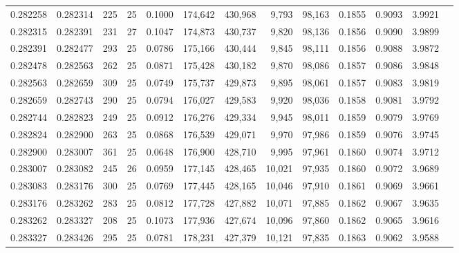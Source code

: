 \begin{tabular}{rrrrrrrrrrrrr}
0.282258 & 0.282314 &   225 &  25 &                                     0.1000 & 174,642 & 430,968 &   9,793 &  98,163 & 0.1855 & 0.9093 & 3.9921 \\
0.282315 & 0.282391 &   231 &  27 &                                     0.1047 & 174,873 & 430,737 &   9,820 &  98,136 & 0.1856 & 0.9090 & 3.9899 \\
0.282391 & 0.282477 &   293 &  25 &                                     0.0786 & 175,166 & 430,444 &   9,845 &  98,111 & 0.1856 & 0.9088 & 3.9872 \\
0.282478 & 0.282563 &   262 &  25 &                                     0.0871 & 175,428 & 430,182 &   9,870 &  98,086 & 0.1857 & 0.9086 & 3.9848 \\
0.282563 & 0.282659 &   309 &  25 &                                     0.0749 & 175,737 & 429,873 &   9,895 &  98,061 & 0.1857 & 0.9083 & 3.9819 \\
0.282659 & 0.282743 &   290 &  25 &                                     0.0794 & 176,027 & 429,583 &   9,920 &  98,036 & 0.1858 & 0.9081 & 3.9792 \\
0.282744 & 0.282823 &   249 &  25 &                                     0.0912 & 176,276 & 429,334 &   9,945 &  98,011 & 0.1859 & 0.9079 & 3.9769 \\
0.282824 & 0.282900 &   263 &  25 &                                     0.0868 & 176,539 & 429,071 &   9,970 &  97,986 & 0.1859 & 0.9076 & 3.9745 \\
0.282900 & 0.283007 &   361 &  25 &                                     0.0648 & 176,900 & 428,710 &   9,995 &  97,961 & 0.1860 & 0.9074 & 3.9712 \\
0.283007 & 0.283082 &   245 &  26 &                                     0.0959 & 177,145 & 428,465 &  10,021 &  97,935 & 0.1860 & 0.9072 & 3.9689 \\
0.283083 & 0.283176 &   300 &  25 &                                     0.0769 & 177,445 & 428,165 &  10,046 &  97,910 & 0.1861 & 0.9069 & 3.9661 \\
0.283176 & 0.283262 &   283 &  25 &                                     0.0812 & 177,728 & 427,882 &  10,071 &  97,885 & 0.1862 & 0.9067 & 3.9635 \\
0.283262 & 0.283327 &   208 &  25 &                                     0.1073 & 177,936 & 427,674 &  10,096 &  97,860 & 0.1862 & 0.9065 & 3.9616 \\
0.283327 & 0.283426 &   295 &  25 &                                     0.0781 & 178,231 & 427,379 &  10,121 &  97,835 & 0.1863 & 0.9062 & 3.9588 \\

\end{tabular}
